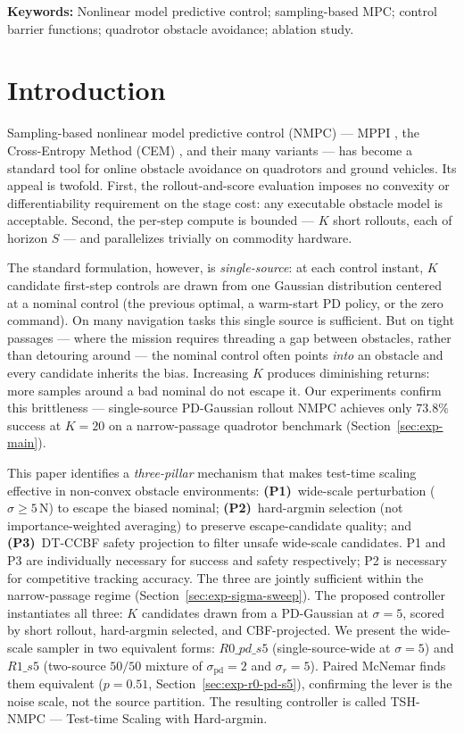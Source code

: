 \documentclass[11pt,onecolumn,a4paper]{article}
\newcommand{\pd}{\mathrm{pd}}
\begin{document}
\medskip
\noindent\textbf{Keywords:} Nonlinear model predictive control; sampling-based MPC; control barrier functions; quadrotor obstacle avoidance; ablation study.
\medskip

\section{Introduction}

Sampling-based nonlinear model predictive control (NMPC) --- MPPI
\cite{WIL17}, the Cross-Entropy Method (CEM) \cite{BOT13}, and their
many variants --- has become a standard tool for online obstacle
avoidance on quadrotors and ground vehicles. Its appeal is twofold.
First, the rollout-and-score evaluation imposes no convexity or
differentiability requirement on the stage cost: any executable
obstacle model is acceptable. Second, the per-step compute is bounded
--- $K$ short rollouts, each of horizon $S$ --- and parallelizes
trivially on commodity hardware.

The standard formulation, however, is \emph{single-source}: at each
control instant, $K$ candidate first-step controls are drawn from one
Gaussian distribution centered at a nominal control (the previous
optimal, a warm-start PD policy, or the zero command). On many
navigation tasks this single source is sufficient. But on tight
passages --- where the mission requires threading a gap between
obstacles, rather than detouring around --- the nominal control often
points \emph{into} an obstacle and every candidate inherits the bias.
Increasing $K$ produces diminishing returns: more samples around a bad
nominal do not escape it. Our experiments confirm this brittleness ---
single-source PD-Gaussian rollout NMPC achieves only $73.8\%$ success
at $K = 20$ on a narrow-passage quadrotor benchmark
(Section~\ref{sec:exp-main}).

This paper identifies a \emph{three-pillar} mechanism that makes
test-time scaling effective in non-convex obstacle environments:
\textbf{(P1)}~wide-scale perturbation ($\sigma \ge 5\,$N) to escape
the biased nominal; \textbf{(P2)}~hard-argmin selection (not
importance-weighted averaging) to preserve escape-candidate quality;
and \textbf{(P3)}~DT-CCBF safety projection to filter unsafe
wide-scale candidates. P1 and P3 are individually necessary for
success and safety respectively; P2 is necessary for competitive
tracking accuracy. The three are jointly sufficient within the
narrow-passage regime (Section~\ref{sec:exp-sigma-sweep}).
The proposed controller instantiates all three: $K$ candidates drawn
from a PD-Gaussian at $\sigma = 5$, scored by short rollout,
hard-argmin selected, and CBF-projected.
We present the wide-scale sampler in two equivalent forms:
$R0\_pd\_s5$ (single-source-wide at $\sigma = 5$) and $R1\_s5$
(two-source $50/50$ mixture of $\sigma_\pd = 2$ and $\sigma_r = 5$).
Paired McNemar finds them equivalent ($p = 0.51$,
Section~\ref{sec:exp-r0-pd-s5}), confirming the lever is the noise
scale, not the source partition. The resulting controller is called
TSH-NMPC --- Test-time Scaling with Hard-argmin.
\end{document}
